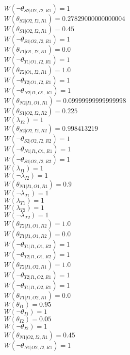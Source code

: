$W(\neg\theta_{S2|O2,I2,R1})=1$\\
$W(\theta_{S2|O2,I2,R1})=0.27829000000000004$\\
$W(\theta_{S1|O2,I2,R1})=0.45$\\
$W(\neg\theta_{S1|O2,I2,R1})=1$\\
$W(\theta_{T1|O1,I2,R1})=0.0$\\
$W(\neg\theta_{T1|O1,I2,R1})=1$\\
$W(\theta_{T2|O1,I2,R1})=1.0$\\
$W(\neg\theta_{T2|O1,I2,R1})=1$\\
$W(\neg\theta_{N2|I1,O1,R1})=1$\\
$W(\theta_{N2|I1,O1,R1})=0.09999999999999998$\\
$W(\theta_{S1|O2,I2,R2})=0.225$\\
$W(\lambda_{I2})=1$\\
$W(\theta_{S2|O2,I2,R2})=0.998413219$\\
$W(\neg\theta_{S2|O2,I2,R2})=1$\\
$W(\neg\theta_{N1|I1,O1,R1})=1$\\
$W(\neg\theta_{S1|O2,I2,R2})=1$\\
$W(\lambda_{I1})=1$\\
$W(\neg\lambda_{I2})=1$\\
$W(\theta_{N1|I1,O1,R1})=0.9$\\
$W(\neg\lambda_{T1})=1$\\
$W(\lambda_{T1})=1$\\
$W(\lambda_{T2})=1$\\
$W(\neg\lambda_{T2})=1$\\
$W(\theta_{T2|I1,O1,R2})=1.0$\\
$W(\theta_{T1|I1,O1,R2})=0.0$\\
$W(\neg\theta_{T1|I1,O1,R2})=1$\\
$W(\neg\theta_{T2|I1,O1,R2})=1$\\
$W(\theta_{T2|I1,O2,R1})=1.0$\\
$W(\neg\theta_{T2|I1,O2,R1})=1$\\
$W(\neg\theta_{T1|I1,O2,R1})=1$\\
$W(\theta_{T1|I1,O2,R1})=0.0$\\
$W(\theta_{I1})=0.95$\\
$W(\neg\theta_{I1})=1$\\
$W(\theta_{I2})=0.05$\\
$W(\neg\theta_{I2})=1$\\
$W(\theta_{N1|O2,I2,R1})=0.45$\\
$W(\neg\theta_{N1|O2,I2,R1})=1$\\
